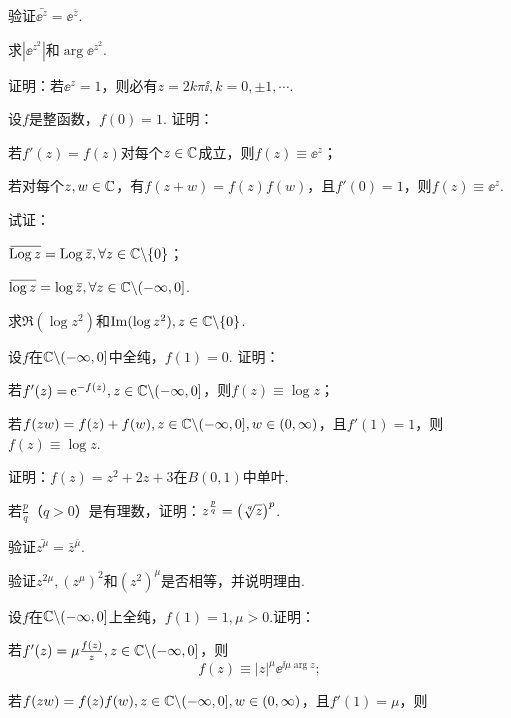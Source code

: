 \begin{xiti}
  \item 验证$\bar{\ee^z}=\ee^{\bar z}$.
  \item 求$|\ee^{z^2}|$和$\arg \ee^{z^2}$.
  \item 证明：若$\ee^z=1$，则必有$z=2k\pi\ii,k=0,\pm1,\cdots$.
  \item 设$f$是整函数，$f(0)=1$. 证明：
    \begin{enuma}
      \item 若$f'(z)=f(z)$对每个$z\in \mathbb C$成立，则$f(z)\equiv \ee^z$；
      \item 若对每个$z,w\in\mathbb C$，有$f(z+w)=f(z)f(w)$，且$f'(0)=1$，则$f(z)\equiv\ee^z$.
    \end{enuma}
  \item 试证：
    \begin{enuma}
      \item ${}\mkern2mu\overline{\mkern-2mu\operatorname{Log} z}=\operatorname{Log} {}\mkern2mu\overline{\mkern-2muz},\forall z\in \mathbb C\backslash\{0\}$；
      \item ${}\mkern2mu\overline{\mkern-2mu\log z}=\log {}\mkern2mu\overline{\mkern-2muz},\forall z\in \mathbb C\backslash(-\infty,0]$.
    \end{enuma}
  \item 求$\Re(\log z^2)$和$\operatorname{Im}(\log z^2),z\in\mathbb C\backslash\{0\}$.
  \item 设$f$在$\mathbb C\backslash(-\infty,0]$中全纯，$f(1)=0$. 证明：
    \begin{enuma}
      \item 若$f'(z)=\operatorname{\!\!\;\mathrm e}^{-f(z)},z\in\mathbb C\backslash(-\infty,0]$，则$f(z)\equiv \log z$；
      \item 若$f(zw)=f(z)+f(w),z\in\mathbb C\backslash(-\infty,0],w\in(0,\infty)$，且$f'(1)=1$，则$f(z)\equiv\log z$.
    \end{enuma}
  \item 证明：$f(z)=z^2+2z+3$在$B(0,1)$中单叶.
  \item 若$\frac pq$（$q>0$）是有理数，证明：$z^{\frac pq}=\big(\sqrt[\leftroot{-1}\uproot{2}q]z\big)^p$.
  \item 验证$\bar{z^\mu}=\bar z^{\bar\mu}$.
  \item 验证$z^{2\mu},(z^\mu)^2$和$(z^2)^\mu$是否相等，并说明理由.
  \item 设$f$在$\mathbb C\backslash(-\infty,0]$上全纯，$f(1)=1,\mu>0$.证明：
    \begin{enuma}
      \item 若$f'(z)=\mu\frac{f(z)}z,z\in\mathbb C\backslash(-\infty,0]$，则
        \[
          f(z) \equiv |z|^\mu \ee^{\ii\mu\arg z};
        \]
      \item 若$f(zw)=f(z)f(w),z\in\mathbb C\backslash(-\infty,0],w\in(0,\infty)$，且$f'(1)=\mu$，则

\end{enuma}
\end{xiti}
